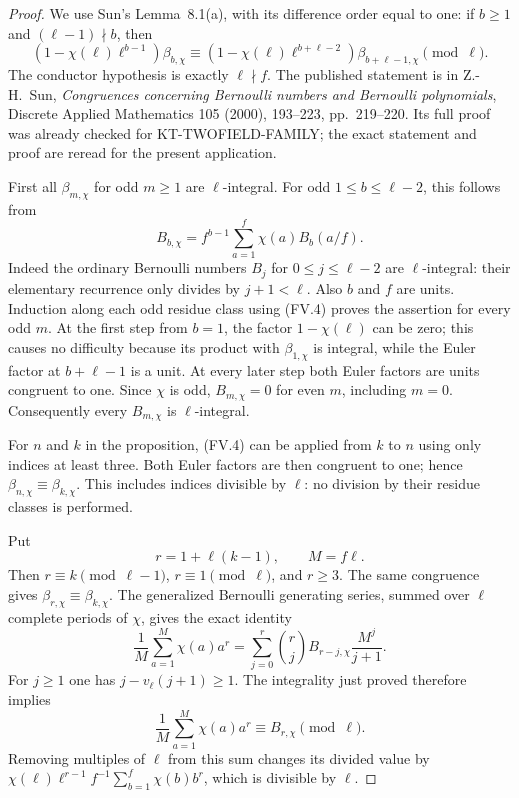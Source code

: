 \documentclass[11pt,a4paper]{article}
\theoremstyle{definition}
\begin{document}
\begin{proof}
We use Sun's Lemma~8.1(a), with its difference order equal to one:
if $b\geq1$ and $(\ell-1)\nmid b$, then
\[
 (1-\chi(\ell)\ell^{b-1})\beta_{b,\chi}
 \equiv
 (1-\chi(\ell)\ell^{b+\ell-2})\beta_{b+\ell-1,\chi}
                                  \pmod\ell.               \tag{FV.4}
\]
The conductor hypothesis is exactly $\ell\nmid f$.  The published
statement is in Z.-H.~Sun, \emph{Congruences concerning Bernoulli
numbers and Bernoulli polynomials}, Discrete Applied Mathematics
105 (2000), 193--223, pp.~219--220.  Its full proof was already
checked for KT-TWOFIELD-FAMILY; the exact statement and proof are
reread for the present application.

First all $\beta_{m,\chi}$ for odd $m\geq1$ are $\ell$-integral.
For odd $1\leq b\leq\ell-2$, this follows from
\[
 B_{b,\chi}=f^{b-1}\sum_{a=1}^{f}\chi(a)B_b(a/f).
\]
Indeed the ordinary Bernoulli numbers $B_j$ for $0\leq j\leq\ell-2$
are $\ell$-integral: their elementary recurrence only divides by
$j+1<\ell$.  Also $b$ and $f$ are units.  Induction along each odd
residue class using (FV.4) proves the assertion for every odd $m$.
At the first step from $b=1$, the factor $1-\chi(\ell)$ can be zero;
this causes no difficulty because its product with $\beta_{1,\chi}$
is integral, while the Euler factor at $b+\ell-1$ is a unit.
At every later step both Euler factors are units congruent to one.
Since $\chi$ is odd, $B_{m,\chi}=0$ for even $m$, including $m=0$.
Consequently every $B_{m,\chi}$ is $\ell$-integral.

For $n$ and $k$ in the proposition, (FV.4) can be applied from $k$
to $n$ using only indices at least three.  Both Euler factors are
then congruent to one; hence $\beta_{n,\chi}\equiv\beta_{k,\chi}$.
This includes indices divisible by $\ell$: no division by their
residue classes is performed.

Put
\[
                        r=1+\ell(k-1),\qquad M=f\ell.
\]
Then $r\equiv k\pmod{\ell-1}$, $r\equiv1\pmod\ell$, and $r\geq3$.
The same congruence gives $\beta_{r,\chi}\equiv\beta_{k,\chi}$.
The generalized Bernoulli generating series, summed over $\ell$
complete periods of $\chi$, gives the exact identity
\[
 \frac1M\sum_{a=1}^{M}\chi(a)a^r
   =\sum_{j=0}^{r}\binom rj B_{r-j,\chi}\frac{M^j}{j+1}.
                                                               \tag{FV.5}
\]
For $j\geq1$ one has $j-v_\ell(j+1)\geq1$.  The integrality just
proved therefore implies
\[
 \frac1M\sum_{a=1}^{M}\chi(a)a^r\equiv B_{r,\chi}\pmod\ell.
                                                               \tag{FV.6}
\]
Removing multiples of $\ell$ from this sum changes its divided
value by
$\chi(\ell)\ell^{r-1}f^{-1}\sum_{b=1}^{f}\chi(b)b^r$,
which is divisible by $\ell$.


\end{proof}
\end{document}

